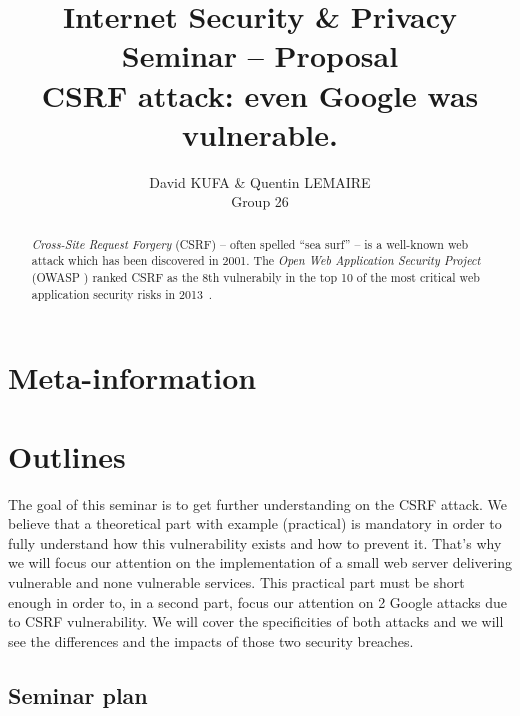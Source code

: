 \documentclass[a4paper,11pt]{article}
\title{Internet Security \& Privacy\\Seminar -- Proposal\\\vspace{10pt}\textbf{CSRF attack: even Google was vulnerable.}}
\author{David KUFA \& Quentin LEMAIRE\\Group 26}
\newcommand{\csrf}{\textit{Cross-Site Request Forgery}}
\begin{document}
  \maketitle %

  \begin{abstract}
  \csrf{} (CSRF) -- often spelled ``sea surf'' -- is a well-known web attack which has 
  been discovered in 2001. The \textit{Open Web Application Security Project} (OWASP \cite{owasp}) 
  ranked CSRF as the 8th vulnerabily in the top 10 of the most critical web application 
  security risks in 2013~\cite{owasp_top_ten}.

  \end{abstract}
  


  \section{Meta-information}


  \section{Outlines}
  
  
  The goal of this seminar is to get further understanding on the CSRF attack. We believe 
  that a theoretical part with example (practical) is mandatory in order to fully understand 
  how this vulnerability exists and how to prevent it. That's why we will focus our attention 
  on the implementation of a small web server delivering vulnerable and none vulnerable 
  services. This practical part must be short enough in order to, in a second part, focus our 
  attention on 2 Google attacks due to CSRF vulnerability. We will cover the specificities 
  of both attacks and we will see the differences and the impacts of those two security 
  breaches.
  
  \subsection{Seminar plan}
  
\end{document}
